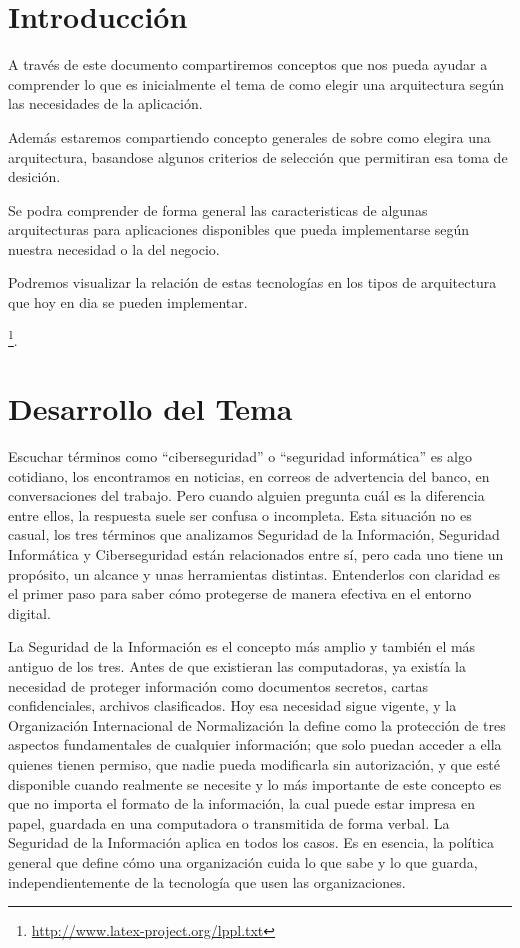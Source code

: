 \documentclass[
	article,			%
	11pt,				%
	oneside,			%
	a4paper,			%
	english,			%
	brazil,				%
	sumario=tradicional
	]{abntex2}
\begin{document}
\section*{Introducción}

A través de este documento compartiremos conceptos que nos pueda ayudar a comprender lo que es inicialmente el tema de como elegir una arquitectura según las necesidades de la aplicación.

Además estaremos compartiendo concepto generales de sobre como elegira una arquitectura, basandose algunos criterios de selección que permitiran esa toma de desición.

Se podra comprender de forma general las caracteristicas de algunas arquitecturas para aplicaciones disponibles que pueda implementarse según nuestra necesidad o la del negocio.

Podremos visualizar la relación de estas tecnologías en los tipos de arquitectura que hoy en dia se pueden implementar.

\footnote{\url{http://www.latex-project.org/lppl.txt}}.


\section{Desarrollo del Tema}
Escuchar términos como “ciberseguridad” o “seguridad informática” es algo cotidiano, los encontramos en noticias, en correos de advertencia del banco, en conversaciones del trabajo. Pero cuando alguien pregunta cuál es la diferencia entre ellos, la respuesta suele ser confusa o incompleta. Esta situación no es casual, los tres términos que analizamos Seguridad de la Información, Seguridad Informática y Ciberseguridad están relacionados entre sí, pero cada uno tiene un propósito, un alcance y unas herramientas distintas. Entenderlos con claridad es el primer paso para saber cómo protegerse de manera efectiva en el entorno digital.

La Seguridad de la Información es el concepto más amplio y también el más antiguo de los tres. Antes de que existieran las computadoras, ya existía la necesidad de proteger información como documentos secretos, cartas confidenciales, archivos clasificados. Hoy esa necesidad sigue
vigente, y la Organización Internacional de Normalización la define como la protección de tres aspectos fundamentales de cualquier información; que solo puedan acceder a ella quienes tienen permiso, que nadie pueda modificarla sin autorización, y que esté disponible cuando realmente se necesite y lo más importante de este concepto es que no importa el formato de la información, la cual puede estar impresa en papel, guardada en una computadora o transmitida de forma verbal. La Seguridad de la Información aplica en todos los casos. Es en esencia, la política general que define cómo una organización cuida lo que sabe y lo que guarda, independientemente de la tecnología que usen las organizaciones.
\end{document}
